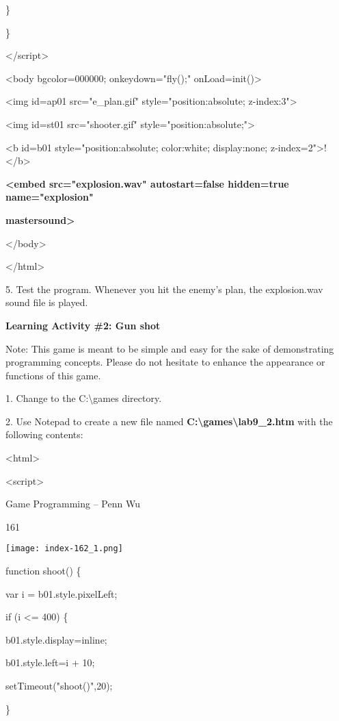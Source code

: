 \documentclass[
]{article}
\begin{document}
\}

\}

\textless/script\textgreater{}

\textless body bgcolor=000000; onkeydown="fly();"
onLoad=init()\textgreater{}

\textless img id=ap01 src="e\_plan.gif" style="position:absolute;
z-index:3"\textgreater{}

\textless img id=st01 src="shooter.gif"
style="position:absolute;"\textgreater{}

\textless b id=b01 style="position:absolute; color:white; display:none;
z-index=2"\textgreater!\textless/b\textgreater{}

\textbf{\textless embed src="explosion.wav" autostart=false hidden=true
name="explosion"}

\textbf{mastersound\textgreater{}}

\textless/body\textgreater{}

\textless/html\textgreater{}

5. Test the program. Whenever you hit the enemy's plan, the
explosion.wav sound file is played.

\textbf{Learning Activity \#2: Gun shot}

Note: This game is meant to be simple and easy for the sake of
demonstrating programming concepts. Please do not hesitate to enhance
the appearance or functions of this game.

1. Change to the C:\textbackslash games directory.

2. Use Notepad to create a new file named
\textbf{C:\textbackslash games\textbackslash lab9\_2.htm} with the
following contents:

\textless html\textgreater{}

\textless script\textgreater{}

Game Programming -- Penn Wu

161

\protect\hypertarget{index_split_010.htmlux5cux23p162}{}{}\texttt{[image: index-162\_1.png]}

function shoot() \{

var i = b01.style.pixelLeft;

if (i \textless= 400) \{

b01.style.display=\textquotesingle inline\textquotesingle;

b01.style.left=i + 10;

setTimeout("shoot()",20);

\}
\end{document}
